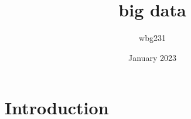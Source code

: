 \documentclass{article}
\title{big data}
\author{wbg231 }
\date{January 2023}
\begin{document}
\maketitle

\section{Introduction}
\end{document}
